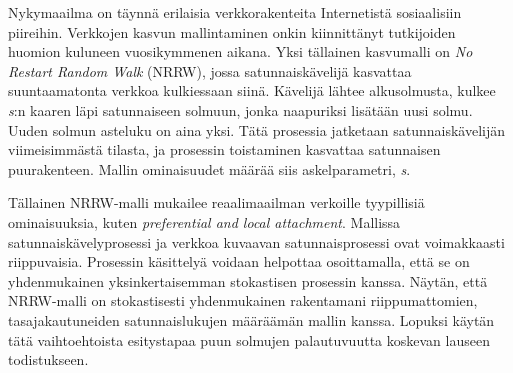 \documentclass[finnish, 12pt, a4paper, sci, utf8, pdfa]{aaltothesis}
\date{1.5.2018}
\begin{document}
	
\makecoverpage

\makecopyrightpage

\begin{abstractpage}[finnish]
Nykymaailma on täynnä erilaisia verkkorakenteita Internetistä sosiaalisiin piireihin.
Verkkojen kasvun mallintaminen onkin kiinnittänyt tutkijoiden huomion kuluneen vuosikymmenen aikana.
Yksi tällainen kasvumalli on \textit{No Restart Random Walk} (NRRW), jossa satunnaiskävelijä
kasvattaa suuntaamatonta verkkoa kulkiessaan siinä. Kävelijä lähtee alkusolmusta, kulkee \textit{s}:n
kaaren läpi satunnaiseen solmuun, jonka naapuriksi lisätään uusi solmu. Uuden solmun asteluku on aina yksi. 
Tätä prosessia jatketaan satunnaiskävelijän viimeisimmästä tilasta, ja prosessin toistaminen kasvattaa satunnaisen puurakenteen. 
Mallin ominaisuudet määrää siis askelparametri, \textit{s}.

Tällainen NRRW-malli mukailee reaalimaailman verkoille tyypillisiä ominaisuuksia, 
kuten \textit{preferential and local attachment}. Mallissa satunnaiskävelyprosessi
ja verkkoa kuvaavan satunnaisprosessi ovat voimakkaasti riippuvaisia. Prosessin käsittelyä
voidaan helpottaa osoittamalla, että se on yhdenmukainen yksinkertaisemman stokastisen prosessin kanssa.
Näytän, että NRRW-malli on stokastisesti yhdenmukainen rakentamani riippumattomien, tasajakautuneiden
satunnaislukujen määräämän mallin kanssa. Lopuksi käytän tätä vaihtoehtoista esitystapaa puun solmujen palautuvuutta
koskevan lauseen todistukseen.
\end{abstractpage}

\end{document}
